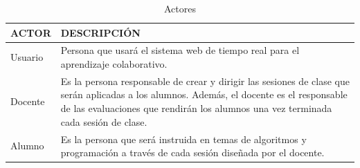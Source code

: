 \begin{longtable}{|L{3cm}|L{7cm}|}
	\caption{Actores}
	\label{tab:das_actores}\\
	\hline
	ACTOR & DESCRIPCIÓN \\
	\hline
	Usuario & Persona que usará el sistema web de tiempo real para el aprendizaje colaborativo.\\
	\hline
	Docente & Es la persona responsable de crear y dirigir las sesiones de clase que serán aplicadas a los alumnos. Además, el docente es el responsable de las evaluaciones que rendirán los alumnos una vez terminada cada sesión de clase.\\
	\hline
	Alumno & Es la persona que será instruida en temas de algoritmos y programación a través de cada sesión diseñada por el docente.\\
	\hline
\end{longtable}

